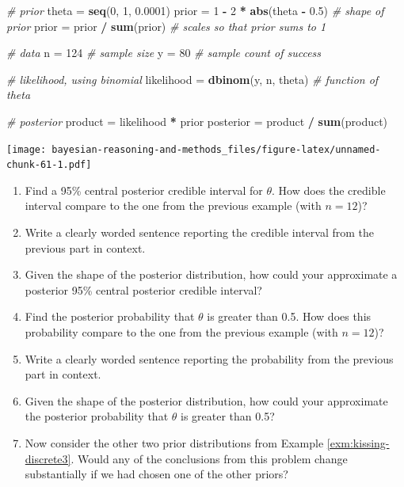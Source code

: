 \documentclass[
]{book}
\newenvironment{Shaded}{\begin{snugshade}}{\end{snugshade}}
\newcommand{\CommentTok}[1]{\textcolor[rgb]{0.56,0.35,0.01}{\textit{#1}}}
\newcommand{\DecValTok}[1]{\textcolor[rgb]{0.00,0.00,0.81}{#1}}
\newcommand{\FloatTok}[1]{\textcolor[rgb]{0.00,0.00,0.81}{#1}}
\newcommand{\KeywordTok}[1]{\textcolor[rgb]{0.13,0.29,0.53}{\textbf{#1}}}
\newcommand{\NormalTok}[1]{#1}
\newcommand{\OperatorTok}[1]{\textcolor[rgb]{0.81,0.36,0.00}{\textbf{#1}}}
\newcommand{\StringTok}[1]{\textcolor[rgb]{0.31,0.60,0.02}{#1}}
\providecommand{\tightlist}{%
  \setlength{\itemsep}{0pt}\setlength{\parskip}{0pt}}
\theoremstyle{definition}
\theoremstyle{definition}
\theoremstyle{definition}
\theoremstyle{remark}
\begin{document}
\begin{Shaded}
\begin{Highlighting}[]
\CommentTok{\# prior}
\NormalTok{theta =}\StringTok{ }\KeywordTok{seq}\NormalTok{(}\DecValTok{0}\NormalTok{, }\DecValTok{1}\NormalTok{, }\FloatTok{0.0001}\NormalTok{)}
\NormalTok{prior =}\StringTok{ }\DecValTok{1} \OperatorTok{{-}}\StringTok{ }\DecValTok{2} \OperatorTok{*}\StringTok{ }\KeywordTok{abs}\NormalTok{(theta }\OperatorTok{{-}}\StringTok{ }\FloatTok{0.5}\NormalTok{) }\CommentTok{\# shape of prior}
\NormalTok{prior =}\StringTok{ }\NormalTok{prior }\OperatorTok{/}\StringTok{ }\KeywordTok{sum}\NormalTok{(prior) }\CommentTok{\# scales so that prior sums to 1}

\CommentTok{\# data}
\NormalTok{n =}\StringTok{ }\DecValTok{124} \CommentTok{\# sample size}
\NormalTok{y =}\StringTok{ }\DecValTok{80} \CommentTok{\# sample count of success}

\CommentTok{\# likelihood, using binomial}
\NormalTok{likelihood =}\StringTok{ }\KeywordTok{dbinom}\NormalTok{(y, n, theta) }\CommentTok{\# function of theta}

\CommentTok{\# posterior}
\NormalTok{product =}\StringTok{ }\NormalTok{likelihood }\OperatorTok{*}\StringTok{ }\NormalTok{prior}
\NormalTok{posterior =}\StringTok{ }\NormalTok{product }\OperatorTok{/}\StringTok{ }\KeywordTok{sum}\NormalTok{(product)}
\end{Highlighting}
\end{Shaded}

\texttt{[image: bayesian-reasoning-and-methods\_files/figure-latex/unnamed-chunk-61-1.pdf]}

\begin{enumerate}
\def\labelenumi{\arabic{enumi}.}
\tightlist
\item
  Find a 95\% central posterior credible interval for \(\theta\). How does the credible interval compare to the one from the previous example (with \(n=12\))?
\item
  Write a clearly worded sentence reporting the credible interval from the previous part in context.
\item
  Given the shape of the posterior distribution, how could your approximate a posterior 95\% central posterior credible interval?
\item
  Find the posterior probability that \(\theta\) is greater than 0.5. How does this probability compare to the one from the previous example (with \(n=12\))?
\item
  Write a clearly worded sentence reporting the probability from the previous part in context.
\item
  Given the shape of the posterior distribution, how could your approximate the posterior probability that \(\theta\) is greater than 0.5?
\item
  Now consider the other two prior distributions from Example \ref{exm:kissing-discrete3}.
  Would any of the conclusions from this problem change substantially if we had chosen one of the other priors?
\end{enumerate}
\end{document}
